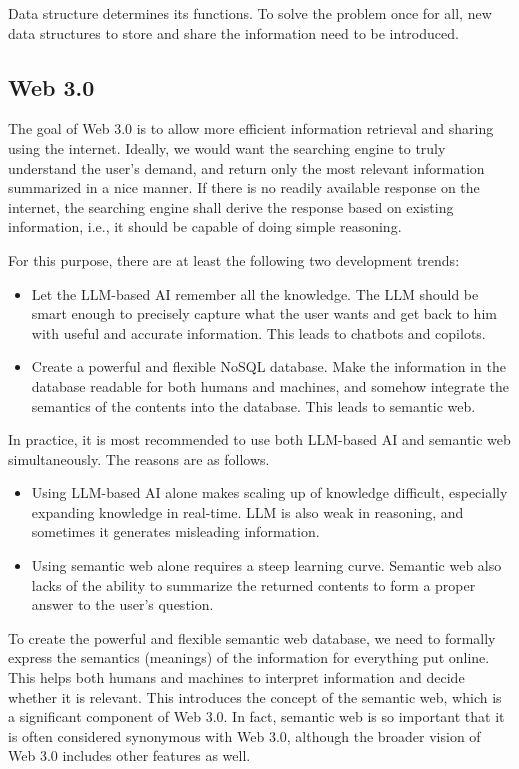 Data structure determines its functions. To solve the problem once for all, new data structures to store and share the information need to be introduced.

\subsection{Web 3.0}

The goal of Web 3.0 is to allow more efficient information retrieval and sharing using the internet. Ideally, we would want the searching engine to truly understand the user's demand, and return only the most relevant information summarized in a nice manner. If there is no readily available response on the internet, the searching engine shall derive the response based on existing information, i.e., it should be capable of doing simple reasoning. 

For this purpose, there are at least the following two development trends:
\begin{itemize}
  \item Let the LLM-based AI remember all the knowledge. The LLM should be smart enough to precisely capture what the user wants and get back to him with useful and accurate information. This leads to chatbots and copilots.
  \item Create a powerful and flexible NoSQL database. Make the information in the database readable for both humans and machines, and somehow integrate the semantics of the contents into the database. This leads to semantic web.
\end{itemize}

In practice, it is most recommended to use both LLM-based AI and semantic web simultaneously. The reasons are as follows.
\begin{itemize}
	\item Using LLM-based AI alone makes scaling up of knowledge difficult, especially expanding knowledge in real-time. LLM is also weak in reasoning, and sometimes it generates misleading information.
	\item Using semantic web alone requires a steep learning curve. Semantic web also lacks of the ability to summarize the returned contents to form a proper answer to the user's question.
\end{itemize}





To create the powerful and flexible semantic web database, we need to formally express the semantics (meanings) of the information for everything put online. This helps both humans and machines to interpret information and decide whether it is relevant. This introduces the concept of the semantic web, which is a significant component of Web 3.0. In fact, semantic web is so important that it is often considered synonymous with Web 3.0, although the broader vision of Web 3.0 includes other features as well.

